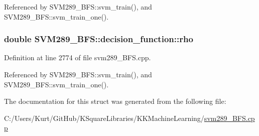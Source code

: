 Referenced by S\+V\+M289\+\_\+\+B\+F\+S\+::svm\+\_\+train(), and S\+V\+M289\+\_\+\+B\+F\+S\+::svm\+\_\+train\+\_\+one().

\subsubsection[{\texorpdfstring{rho}{rho}}]{\setlength{\rightskip}{0pt plus 5cm}double S\+V\+M289\+\_\+\+B\+F\+S\+::decision\+\_\+function\+::rho}\hypertarget{struct_s_v_m289___b_f_s_1_1decision__function_a0222d06bf34cc9738dd7c66585b6f5d8}{}\label{struct_s_v_m289___b_f_s_1_1decision__function_a0222d06bf34cc9738dd7c66585b6f5d8}


Definition at line 2774 of file svm289\+\_\+\+B\+F\+S.\+cpp.



Referenced by S\+V\+M289\+\_\+\+B\+F\+S\+::svm\+\_\+train(), and S\+V\+M289\+\_\+\+B\+F\+S\+::svm\+\_\+train\+\_\+one().



The documentation for this struct was generated from the following file\+:\begin{DoxyCompactItemize}
\item 
C\+:/\+Users/\+Kurt/\+Git\+Hub/\+K\+Square\+Libraries/\+K\+K\+Machine\+Learning/\hyperlink{svm289___b_f_s_8cpp}{svm289\+\_\+\+B\+F\+S.\+cpp}\end{DoxyCompactItemize}
